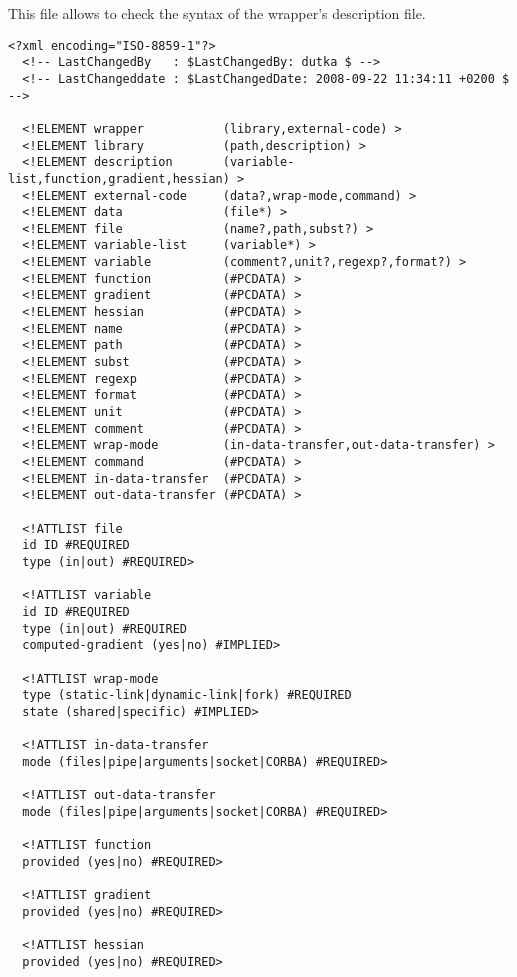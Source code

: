 
This file allows to check the syntax of the wrapper's description file.

\lstset{language=XML, basicstyle=\normalsize}
\begin{lstlisting}[frame=TBRL]
  <?xml encoding="ISO-8859-1"?>
  <!-- LastChangedBy   : $LastChangedBy: dutka $ -->
  <!-- LastChangeddate : $LastChangedDate: 2008-09-22 11:34:11 +0200 $ -->

  <!ELEMENT wrapper           (library,external-code) >
  <!ELEMENT library           (path,description) >
  <!ELEMENT description       (variable-list,function,gradient,hessian) >
  <!ELEMENT external-code     (data?,wrap-mode,command) >
  <!ELEMENT data              (file*) >
  <!ELEMENT file              (name?,path,subst?) >
  <!ELEMENT variable-list     (variable*) >
  <!ELEMENT variable          (comment?,unit?,regexp?,format?) >
  <!ELEMENT function          (#PCDATA) >
  <!ELEMENT gradient          (#PCDATA) >
  <!ELEMENT hessian           (#PCDATA) >
  <!ELEMENT name              (#PCDATA) >
  <!ELEMENT path              (#PCDATA) >
  <!ELEMENT subst             (#PCDATA) >
  <!ELEMENT regexp            (#PCDATA) >
  <!ELEMENT format            (#PCDATA) >
  <!ELEMENT unit              (#PCDATA) >
  <!ELEMENT comment           (#PCDATA) >
  <!ELEMENT wrap-mode         (in-data-transfer,out-data-transfer) >
  <!ELEMENT command           (#PCDATA) >
  <!ELEMENT in-data-transfer  (#PCDATA) >
  <!ELEMENT out-data-transfer (#PCDATA) >

  <!ATTLIST file
  id ID #REQUIRED
  type (in|out) #REQUIRED>

  <!ATTLIST variable
  id ID #REQUIRED
  type (in|out) #REQUIRED
  computed-gradient (yes|no) #IMPLIED>

  <!ATTLIST wrap-mode
  type (static-link|dynamic-link|fork) #REQUIRED
  state (shared|specific) #IMPLIED>

  <!ATTLIST in-data-transfer
  mode (files|pipe|arguments|socket|CORBA) #REQUIRED>

  <!ATTLIST out-data-transfer
  mode (files|pipe|arguments|socket|CORBA) #REQUIRED>

  <!ATTLIST function
  provided (yes|no) #REQUIRED>

  <!ATTLIST gradient
  provided (yes|no) #REQUIRED>

  <!ATTLIST hessian
  provided (yes|no) #REQUIRED>
\end{lstlisting}
